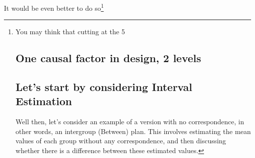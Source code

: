 \documentclass{ltjsarticle}
\begin{document}

It would be even better to do so\footnote{You may think that cutting at the 5%

\section{One causal factor in design, 2 levels}
\subsection{Let's start by considering Interval Estimation}
Well then, let's consider an example of a version with no correspondence, in other words, an intergroup (Between) plan. This involves estimating the mean values of each group without any correspondence, and then discussing whether there is a difference between these estimated values.



}
\end{document}
